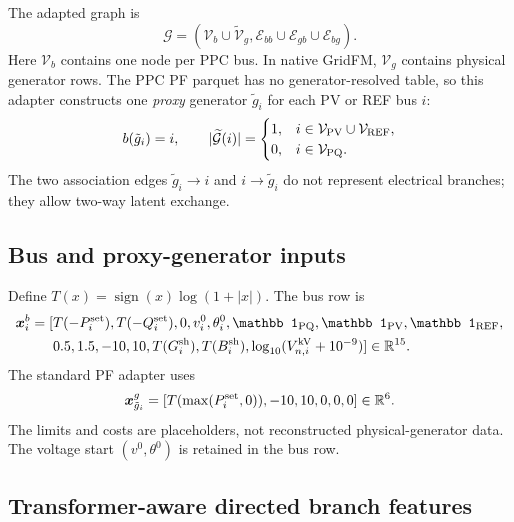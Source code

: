 \documentclass[10pt]{article}
\newcommand{\R}{\mathbb{R}}
\begin{document}
The adapted graph is
\begin{equation}
 \mathcal G=(\mathcal V_b\cup\widetilde{\mathcal V}_g,
 \mathcal E_{bb}\cup\mathcal E_{gb}\cup\mathcal E_{bg}).
\end{equation}
Here \(\mathcal V_b\) contains one node per PPC bus. In native GridFM,
\(\mathcal V_g\) contains physical generator rows. The PPC PF parquet has no
generator-resolved table, so this adapter constructs one \emph{proxy} generator
\(\tilde g_i\) for each PV or REF bus \(i\):
\begin{equation}
 b(\tilde g_i)=i,\qquad
 |\widetilde{\mathcal G}(i)|=
 \begin{cases}1,&i\in\mathcal V_{\rm PV}\cup\mathcal V_{\rm REF},\\0,&i\in\mathcal V_{\rm PQ}.\end{cases}
\end{equation}
The two association edges \(\tilde g_i\to i\) and \(i\to\tilde g_i\) do not
represent electrical branches; they allow two-way latent exchange.

\subsection{Bus and proxy-generator inputs}

Define \(T(x)=\operatorname{sign}(x)\log(1+|x|)\). The bus row is
\begin{align}
 \bm x_i^b=[&T(-P_i^{\rm set}),T(-Q_i^{\rm set}),0,
 v_i^{0},\theta_i^{0},\mathbb 1_{\rm PQ},\mathbb 1_{\rm PV},\mathbb 1_{\rm REF},\nonumber\\
 &0.5,1.5,-10,10,T(G_i^{\rm sh}),T(B_i^{\rm sh}),\log_{10}(V_{n,i}^{\rm kV}+10^{-9})]\in\R^{15}.
\end{align}
The standard PF adapter uses
\begin{equation}
 \bm x_{\tilde g_i}^g=
 [T(\max(P_i^{\rm set},0)),-10,10,0,0,0]\in\R^6.
\end{equation}
The limits and costs are placeholders, not reconstructed physical-generator
data. The voltage start \((v^0,\theta^0)\) is retained in the bus row.

\subsection{Transformer-aware directed branch features}
\end{document}

